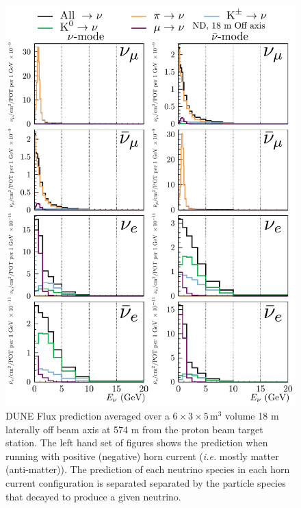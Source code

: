 \documentclass{article}
\begin{document}
\begin{figure}
  \includegraphics[width=\textwidth]{plots/fluxpredcompvar/ND_HadronParentFluxComponents_18m_offaxis}
  \caption{DUNE Flux prediction averaged over a $6\times 3\times 5\,\textrm{m}^{3}$ volume 18 m laterally off beam axis at 574 m from the proton beam target station. The left hand set of figures shows the prediction when running with positive (negative) horn current (\textit{i.e.} mostly matter (anti-matter)). The prediction of each neutrino species in each horn current configuration is separated separated by the particle species that decayed to produce a given neutrino.}
\end{figure}
\end{document}
